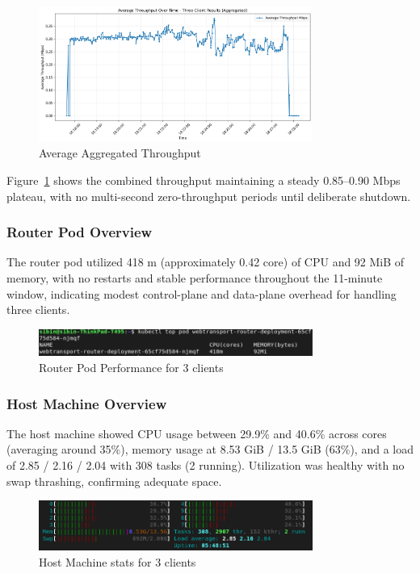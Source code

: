 \begin{figure}[h!]
\centering
\includegraphics[width=0.8\textwidth]{Evaluation/avg_throughput_aggregated_three-client-results.png}
\caption{Average Aggregated Throughput}
\label{fig:avg-throughput-aggregated}
\end{figure}
Figure~\ref{fig:avg-throughput-aggregated} shows the combined throughput maintaining a steady 0.85–0.90 Mbps plateau, with no multi-second zero-throughput periods until deliberate shutdown.

\subsubsection{Router Pod Overview}
The router pod utilized 418 m (approximately 0.42 core) of CPU and 92 MiB of memory, with no restarts and stable performance throughout the 11-minute window, indicating modest control-plane and data-plane overhead for handling three clients.
\begin{figure}[h!]
\centering
\includegraphics[width=0.8\textwidth]{Evaluation/three-clients-stats.png}
\caption{Router Pod Performance for 3 clients}
\label{fig:three-clients-stats}
\end{figure}

\subsubsection{Host Machine Overview}
The host machine showed CPU usage between 29.9\% and 40.6\% across cores (averaging around 35\%), memory usage at 8.53 GiB / 13.5 GiB (63\%), and a load of 2.85 / 2.16 / 2.04 with 308 tasks (2 running). Utilization was healthy with no swap thrashing, confirming adequate space.

\begin{figure}[h!]
\centering
\includegraphics[width=0.8\textwidth]{Evaluation/three-clients-host-stats.png}
\caption{Host Machine stats for 3 clients}
\label{fig:three-clients-host-stats}
\end{figure}

